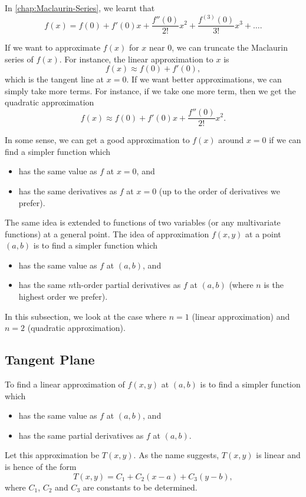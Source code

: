 In \SS\ref{chap:Maclaurin-Series}, we learnt that \[f(x) = f(0) + f'(0) x + \frac{f''(0)}{2!} x^2 + \frac{f^{(3)}(0)}{3!} x^3 + \dots.\]

If we want to approximate $f(x)$ for $x$ near $0$, we can truncate the Maclaurin series of $f(x)$. For instance, the linear approximation to $x$ is \[f(x) \approx f(0) + f'(0),\] which is the tangent line at $x = 0$. If we want better approximations, we can simply take more terms. For instance, if we take one more term, then we get the quadratic approximation \[f(x) \approx f(0) + f'(0) x + \frac{f''(0)}{2!} x^2.\]

In some sense, we can get a good approximation to $f(x)$ around $x = 0$ if we can find a simpler function which
\begin{itemize}
    \item has the same value as $f$ at $x = 0$, and
    \item has the same derivatives as $f$ at $x = 0$ (up to the order of derivatives we prefer).
\end{itemize}

The same idea is extended to functions of two variables (or any multivariate functions) at a general point. The idea of approximation $f(x, y)$ at a point $(a, b)$ is to find a simpler function which
\begin{itemize}
    \item has the same value as $f$ at $(a, b)$, and
    \item has the same $n$th-order partial derivatives as $f$ at $(a, b)$ (where $n$ is the highest order we prefer).
\end{itemize}

In this subsection, we look at the case where $n = 1$ (linear approximation) and $n = 2$ (quadratic approximation).

\subsection{Tangent Plane}

To find a linear approximation of $f(x, y)$ at $(a, b)$ is to find a simpler function which
\begin{itemize}
    \item has the same value as $f$ at $(a, b)$, and
    \item has the same partial derivatives as $f$ at $(a, b)$.
\end{itemize}
Let this approximation be $T(x, y)$. As the name suggests, $T(x, y)$ is linear and is hence of the form \[T(x, y) = C_1 + C_2 (x-a) + C_3 (y-b),\] where $C_1$, $C_2$ and $C_3$ are constants to be determined.

